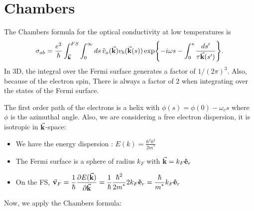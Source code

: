 \documentclass[12pt]{article}
\newcommand{\ddfrac}[2]{{\displaystyle\frac{\displaystyle #1}{\displaystyle #2}}}
\begin{document}
\section{Chambers}
The Chambers formula for the optical conductivity at low temperatures is
\begin{equation}
	\sigma_{ab} = \frac{e^2}{\hbar}\int_{\va{k}}^{FS}\int_0^{\infty}\mathop{ds}
		\hat{v}_a(\va{k})v_b(\va{k}(s))\exp{-i\omega s - \int_0^s \frac{\mathop{ds'}}{\tau \va{k}(s')}}.
\end{equation}
In 3D, the integral over the Fermi surface generates a factor of $1/(2\pi)^3$. Also, because of the
electron spin, There is always a factor of $2$ when integrating over the states of the Fermi
surface.

The first order path of the electrons is a helix with $\phi(s) = \phi(0) - \omega_c s$ where $\phi$
is the azimuthal angle. Also, we are considering a free electron dispersion, it is isotropic in
$\va{k}$-space:
\begin{itemize}
	\item We have the energy dispersion : $E(k) = \ddfrac{\hbar^2k^2}{2m^*}$
	\item The Fermi surface is a sphere of radius $k_F$ with $\va{k} = k_F\vu{e}_r$
	\item On the FS, $\va{v}_F = \ddfrac{1}{\hbar}\ddfrac{\partial E(\va{k})}{\partial\va{k}} = \ddfrac{1}{\hbar}\ddfrac{\hbar^2}{2m^*}2k_F\vu{e}_r = \ddfrac{\hbar}{m^*}k_F\vu{e}_r$
\end{itemize} 
Now, we apply the Chambers formula:
\end{document}
